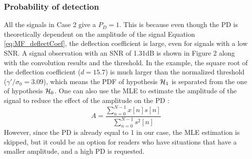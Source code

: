\subsubsection{Probability of detection}
All the signals in Case 2 give a $P_D=1$. This is because even though the PD is theoretically dependent on the amplitude of the signal Equation \eqref{eq:MF_deflectCoef}, the deflection coefficient is large, even for signals with a low SNR. A signal observation with an SNR of 1.31dB is shown in Figure 2 along with the convolution results and the threshold. In the example, the square root of the deflection coefficient ($d = 15.7$) is much larger than the normalized threshold ($\gamma '/\sigma_0 = 3.09$), which means the PDF of hypothesis $\operatorname*{\mathcal{H}_1}$ is separated from the one of hypothesis $\operatorname*{\mathcal{H}_0}$. One can also use the MLE to estimate the amplitude of the signal to reduce the effect of the amplitude on the PD \citep{kay1998fundamentals}: 
\begin{equation}
    A =\frac{\sum_{n=0}^{N-1}x[n]s[n]}{\sum_{n=0}^{N-1}s^2[n]}
\end{equation}
However, since the PD is already equal to 1 in our case, the MLE estimation is skipped, but it could be an option for readers who have situations that have a smaller amplitude, and a high PD is requested.
